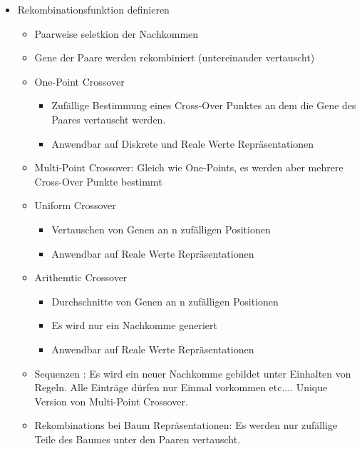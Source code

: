 \begin{itemize}
\begin{itemize}
        \end{itemize}

      \item Rekombinationsfunktion definieren
        \begin{itemize}
          \item Paarweise seletkion der Nachkommen
          \item Gene der Paare werden rekombiniert (untereinander vertauscht)
          \item One-Point Crossover
            \begin{itemize}
              \item Zufällige Bestimmung eines Cross-Over Punktes an dem die Gene des Paares vertauscht werden.
              \item Anwendbar auf Diskrete und Reale Werte Repräsentationen
            \end{itemize}
          \item Multi-Point Crossover: Gleich wie One-Points, es werden aber mehrere Cross-Over Punkte bestimmt
          \item Uniform Crossover
            \begin{itemize}
              \item Vertauschen von Genen an n zufälligen Positionen
              \item Anwendbar auf Reale Werte Repräsentationen
            \end{itemize}
          \item Arithemtic Crossover
            \begin{itemize}
              \item Durchschnitte von Genen an n zufälligen Positionen
              \item Es wird nur ein Nachkomme generiert
              \item Anwendbar auf Reale Werte Repräsentationen
            \end{itemize}
          \item Sequenzen : Es wird ein neuer Nachkomme gebildet unter Einhalten von Regeln. Alle Einträge dürfen nur Einmal vorkommen etc.... Unique Version von Multi-Point Crossover.
          \item Rekombinations bei Baum Repräsentationen: Es werden nur zufällige Teile des Baumes unter den Paaren vertauscht.
        \end{itemize}


\end{itemize}

